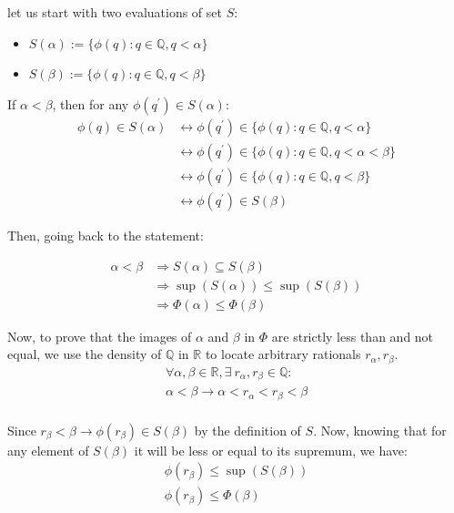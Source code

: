 \begin{bookproof}
let us start with two evaluations of set $S$:
\begin{itemize}
\item $S(\alpha) := \{\phi(q): q \in \mathbb{Q}, q < \alpha \}$
\item $S(\beta) := \{\phi(q): q \in \mathbb{Q}, q < \beta \}$
\end{itemize}

If $\alpha < \beta$, then for any $\phi(q^\prime) \in S(\alpha)$:
\begin{align*}
\phi(q) \in S(\alpha) &\leftrightarrow \phi(q^\prime) \in \{\phi(q): q \in \mathbb{Q}, q < \alpha \} \\
&\leftrightarrow \phi(q^\prime) \in \{\phi(q): q \in \mathbb{Q}, q < \alpha < \beta \} \\
&\leftrightarrow \phi(q^\prime) \in \{\phi(q): q \in \mathbb{Q}, q < \beta \} \\
&\leftrightarrow \phi(q^\prime) \in S(\beta)
\end{align*}

Then, going back to the statement:

\begin{align*}
\alpha < \beta &\Rightarrow S(\alpha) \subseteq S(\beta) \\
&\Rightarrow \sup(S(\alpha)) \leq \sup(S(\beta)) \\
&\Rightarrow \Phi(\alpha) \leq \Phi(\beta)
\end{align*}

Now, to prove that the images of $\alpha$ and $\beta$ in $\Phi$ are strictly less than and not equal, we use the density of $\mathbb{Q}$ in $\mathbb{R}$ to locate arbitrary rationals $r_\alpha, r_\beta$.
\begin{align*}
\forall \alpha, \beta \in \mathbb{R}, \exists \ r_\alpha, r_\beta \in \mathbb{Q}: \\
\alpha < \beta \rightarrow  \alpha < r_\alpha < r_\beta < \beta \\
\end{align*}

Since $r_\beta < \beta \rightarrow \phi(r_\beta) \in S(\beta)$ by the definition of $S$. Now, knowing that for any element of $S(\beta)$ it will be less or equal to its supremum, we have:
\begin{align*}
\phi(r_\beta) \leq \sup(S(\beta)) \\
\phi(r_\beta) \leq \Phi(\beta)
\end{align*}


\end{bookproof}
